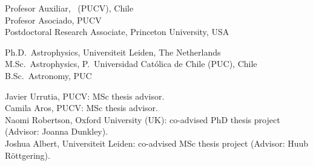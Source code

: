 \documentclass[11pt]{article}
\begin{document}

\noindent
{} Profesor Auxiliar, \pucv\ (PUCV), Chile\\
 Profesor Asociado, PUCV\\
 Postdoctoral Research Associate, Princeton University, USA



\noindent
{} Ph.D.~Astrophysics, Universiteit Leiden, The Netherlands\\
 M.Sc.~Astrophysics, P.~Universidad Cat\'olica de Chile (PUC), Chile\\
 B.Sc.~Astronomy, PUC\\







\noindent
{} Javier Urrutia, PUCV: MSc thesis advisor.\\
 Camila Aros, PUCV: MSc thesis advisor.\\
 Naomi Robertson, Oxford University (UK): co-advised PhD thesis project (Advisor: Joanna Dunkley).\\
 Joshua Albert, Universiteit Leiden: co-advised MSc thesis project (Advisor: Huub R\"ottgering). 

\end{document}
